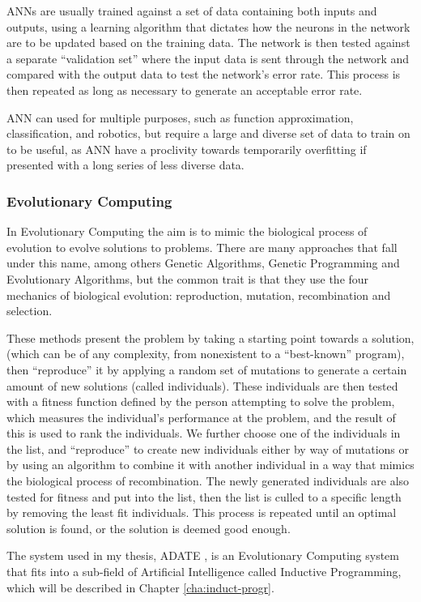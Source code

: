 \documentclass[]{report}
\begin{document}
ANNs are usually trained against a set of data containing both inputs and
outputs, using a learning algorithm that dictates how the neurons in the network
are to be updated based on the training data. The network is then tested against
a separate ``validation set'' where the input data is sent through the network
and compared with the output data to test the network's error rate. This process
is then repeated as long as necessary to generate an acceptable error rate.

ANN can used for multiple purposes, such as function approximation,
classification, and robotics, but require a large and diverse set of data to
train on to be useful, as ANN have a proclivity towards temporarily overfitting
if presented with a long series of less diverse data.

\subsubsection{Evolutionary Computing}
\label{sec:evol-comp}

In Evolutionary Computing the aim is to mimic the biological process of
evolution to evolve solutions to problems. There are many approaches that fall
under this name, among others Genetic Algorithms, Genetic Programming and
Evolutionary Algorithms, but the common trait is that they use the four
mechanics of biological evolution: reproduction, mutation, recombination and
selection.

These methods present the problem by taking a starting point towards a solution,
(which can be of any complexity, from nonexistent to a ``best-known'' program),
then ``reproduce'' it by applying a random set of mutations to generate a
certain amount of new solutions (called individuals). These individuals are then
tested with a fitness function defined by the person attempting to solve the
problem, which measures the individual's performance at the problem, and the
result of this is used to rank the individuals. We further choose one of the
individuals in the list, and ``reproduce'' to create new individuals either by
way of mutations or by using an algorithm to combine it with another individual
in a way that mimics the biological process of recombination. The newly
generated individuals are also tested for fitness and put into the list, then
the list is culled to a specific length by removing the least fit
individuals. This process is repeated until an optimal solution is found, or the
solution is deemed good enough.

The system used in my thesis, ADATE \citep{olsson1995inductive}, is an
Evolutionary Computing system that fits into a sub-field of Artificial
Intelligence called Inductive Programming, which will be described in Chapter
\ref{cha:induct-progr}.
\end{document}
